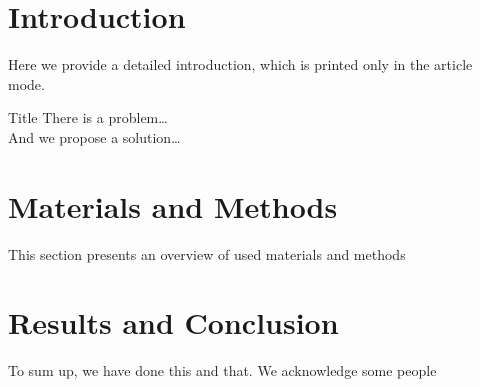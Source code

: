 








\maketitle           %
\frame{\titlepage}   %


\section{Introduction}
  Here we provide a detailed introduction, which is printed only in the article mode.
  \begin{frame}{Title}
    There is a problem\ldots\\
    And we propose a solution\ldots
  \end{frame}


\section{Materials and Methods}
  This section presents an overview of used materials and methods


\section{Results and Conclusion}
  To sum up, we have done this and that. We acknowledge some people




